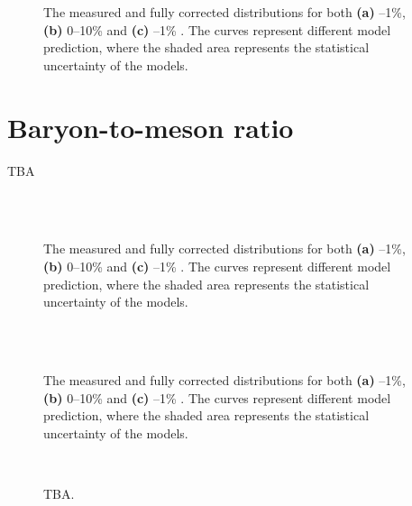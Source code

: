 \begin{figure}%
\\
\\
\caption{The measured and fully corrected \SOPT distributions for both \textbf{(a)} --1\%, \textbf{(b)} 0--10\% and \textbf{(c)} --1\% . The curves represent different model prediction, where the shaded area represents the statistical uncertainty of the models.}
\label{fig:rt:ptK0sMC}
\end{figure}

\section{Baryon-to-meson ratio}

TBA

\begin{figure}%
\\
\\
\caption{The measured and fully corrected \SOPT distributions for both \textbf{(a)} --1\%, \textbf{(b)} 0--10\% and \textbf{(c)} --1\% . The curves represent different model prediction, where the shaded area represents the statistical uncertainty of the models.}
\label{fig:rt:LtoK}
\end{figure}


\begin{figure}%
\\
\\
\caption{The measured and fully corrected \SOPT distributions for both \textbf{(a)} --1\%, \textbf{(b)} 0--10\% and \textbf{(c)} --1\% . The curves represent different model prediction, where the shaded area represents the statistical uncertainty of the models.}
\label{fig:rt:LtoKMC}
\end{figure}

\begin{figure}%
\\
\caption{TBA.}
\label{fig:rt:LtoKreg}
\end{figure}


